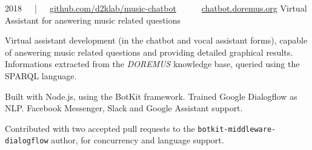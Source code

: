 



\begin{cventries}

	\cvproj
        {2018~~~|~~~\href{https://github.com/D2KLab/music-chatbot}{github.com/d2klab/music-chatbot}~~~\textbullet~~~\href{https://chatbot.doremus.org}{chatbot.doremus.org}}
        {Virtual Assistant for answering music related questions}
        {}
        {}
        {
            \begin{cvitems} %
                \item {Virtual assistant development (in the chatbot and vocal assistant forms), capable of answering music related questions and providing detailed graphical results. Informations extracted from the \textit{DOREMUS} knowledge base, queried using the SPARQL language.}
                \item {Built with Node.js, using the BotKit framework. Trained Google Dialogflow as NLP. Facebook Messenger, Slack and Google Assistant support.}
                \item {Contributed with two accepted pull requests to the \texttt{botkit-middleware-dialogflow} author, for concurrency and language support.}
            \end{cvitems}
        }

	

\end{cventries}
